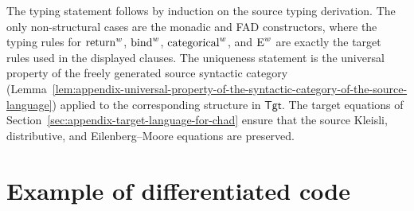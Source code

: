 \documentclass[11pt,a4paper]{article}
\theoremstyle{definition}
\theoremstyle{remark}
\providecommand{\Tgt}{\mathsf{Tgt}}
\begin{document}
The typing statement follows by induction on the source typing derivation.  The
only non-structural cases are the monadic and FAD constructors, where the typing
rules for \(\opn[b]{return}^{w}\), \(\opn[b]{bind}^{w}\),
\(\opn[b]{categorical}^{w}\), and \(\opn[b]{E}^{w}\) are exactly the target rules
used in the displayed clauses.  The uniqueness statement is the universal
property of the freely generated source syntactic category
(Lemma~\ref{lem:appendix-universal-property-of-the-syntactic-category-of-the-source-language})
applied to the corresponding structure in \(\Tgt\).  The target equations of
Section~\ref{sec:appendix-target-language-for-chad} ensure that the source
Kleisli, distributive, and Eilenberg--Moore equations are preserved.


\section{Example of differentiated code}
\label{sec:appendix-example-of-differentiated-code}
\end{document}

